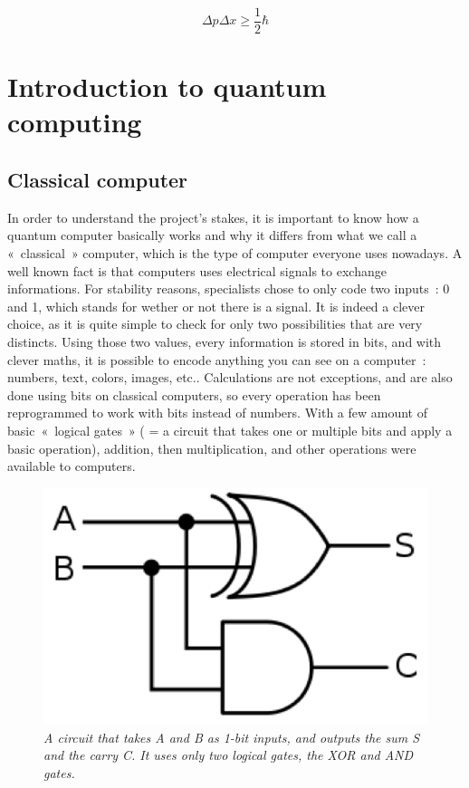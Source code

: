\documentclass[a4paper,12pt]{report}
\newcommand{\para}[1]{\par{#1}\\}
\begin{document}
\begin{equation}
    \Delta p\Delta x \ge \frac12 \hbar
    \label{heisenberg}
\end{equation}

    \section{Introduction to quantum computing}
        \subsection{Classical computer}

\para{
    In order to understand the project’s stakes, it is important to know how a quantum computer basically works and why it differs from what we call a « classical » computer, which is the type of computer everyone uses nowadays.
    A well known fact is that computers uses electrical signals  to exchange informations. For stability reasons, specialists chose to only code two inputs : 0 and 1, which stands for wether or not there is a signal. It is indeed a clever choice, as it is quite simple to check for only two possibilities that are very distincts. Using those two values, every information is stored in bits, and with clever maths, it is possible to encode anything you can see on a computer : numbers, text, colors, images, etc..
    Calculations are not exceptions, and are also done using bits on classical computers, so every operation has been reprogrammed to work with bits instead of numbers. With a few amount of basic « logical gates » ( = a circuit that takes one or multiple bits and apply a basic operation), addition, then multiplication, and other operations were available to computers.
}

\begin{figure}
	\begin{center}
		\includegraphics[scale=0.6]{images/adder}
	\end{center}
	\caption{\textit{A circuit that takes A and B as 1-bit inputs, and outputs the sum S and the carry C. It uses only two logical gates, the XOR and AND gates.}}
	\label{copenhagen}
\end{figure}
\end{document}
